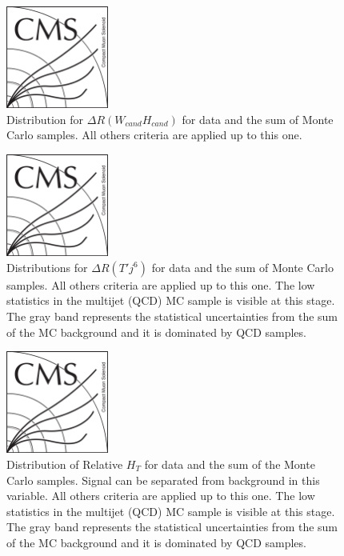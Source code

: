 \begin{figure}[!Hhtbp]
  \begin{center}
    \includegraphics[width=0.3\textwidth]{figs/CMSlogo.png}
    \caption{Distribution for $\Delta R (W_{cand} H_{cand})$ for data and the sum of Monte Carlo samples. All others criteria are applied up to this one.}
    \label{fig:DRWH}
  \end{center}
\end{figure}\clearpage

\begin{figure}[!Hhtbp]
  \begin{center}
    \includegraphics[width=0.3\textwidth]{figs/CMSlogo.png}
    \caption{Distributions for $ \Delta R (T' j^{6})$  for data and the sum of Monte Carlo samples. All others criteria are applied up to this one. The low statistics in the multijet (QCD) MC sample is visible at this stage. The gray band represents the statistical uncertainties from the sum of the MC background and it is dominated by QCD samples.}
    \label{fig:jet6}
  \end{center}
\end{figure}\clearpage

\begin{figure}[!Hhtbp]
  \begin{center}
    \includegraphics[width=0.3\textwidth]{figs/CMSlogo.png}
    \caption{Distribution of Relative $H_{T}$ for data and the sum of the Monte Carlo samples. Signal can be separated from background in this variable. All others criteria are applied up to this one. The low statistics in the multijet (QCD) MC sample is visible at this stage. The gray band represents the statistical uncertainties from the sum of the MC background and it is dominated by QCD samples.}
    \label{fig:RelHtMass}
  \end{center}
\end{figure}\clearpage

